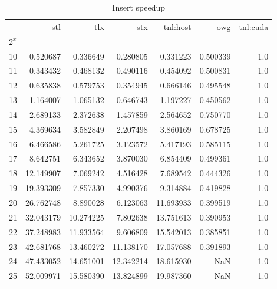 \begin{table}
  \centering
  \begin{tabular}{lrrrrrr}
    \toprule
    {}    & stl       & tlx       & stx       & tnl:host  & owg      & tnl:cuda \\
    $2^x$ &           &           &           &           &          &          \\
    \midrule
    10    & 0.520687  & 0.336649  & 0.280805  & 0.331223  & 0.500339 & 1.0      \\
    11    & 0.343432  & 0.468132  & 0.490116  & 0.454092  & 0.500831 & 1.0      \\
    12    & 0.635838  & 0.579753  & 0.354945  & 0.666146  & 0.495548 & 1.0      \\
    13    & 1.164007  & 1.065132  & 0.646743  & 1.197227  & 0.450562 & 1.0      \\
    14    & 2.689133  & 2.372638  & 1.457859  & 2.564652  & 0.750770 & 1.0      \\
    15    & 4.369634  & 3.582849  & 2.207498  & 3.860169  & 0.678725 & 1.0      \\
    16    & 6.466586  & 5.261725  & 3.123572  & 5.417193  & 0.585115 & 1.0      \\
    17    & 8.642751  & 6.343652  & 3.870030  & 6.854409  & 0.499361 & 1.0      \\
    18    & 12.149907 & 7.069242  & 4.516428  & 7.689542  & 0.444326 & 1.0      \\
    19    & 19.393309 & 7.857330  & 4.990376  & 9.314884  & 0.419828 & 1.0      \\
    20    & 26.762748 & 8.890028  & 6.123063  & 11.693933 & 0.399519 & 1.0      \\
    21    & 32.043179 & 10.274225 & 7.802638  & 13.751613 & 0.390953 & 1.0      \\
    22    & 37.248983 & 11.933564 & 9.606809  & 15.542013 & 0.385851 & 1.0      \\
    23    & 42.681768 & 13.460272 & 11.138170 & 17.057688 & 0.391893 & 1.0      \\
    24    & 47.433052 & 14.651001 & 12.342214 & 18.615930 & NaN      & 1.0      \\
    25    & 52.009971 & 15.580390 & 13.824899 & 19.987360 & NaN      & 1.0      \\
    \bottomrule
  \end{tabular}
  \caption{Insert speedup}
  \label{table:insert-speedup}
\end{table}